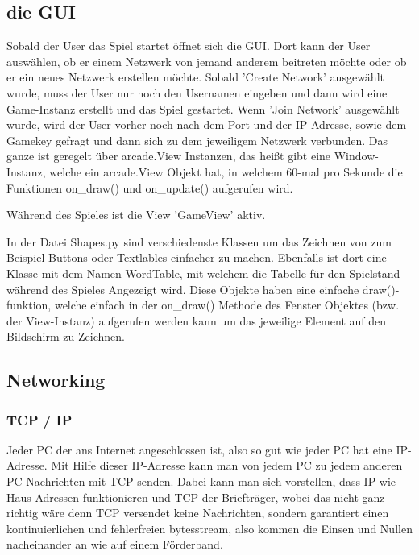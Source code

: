 \documentclass[a4paper]{article}
\begin{document}
            
        
        \subsection{die GUI}
            Sobald der User das Spiel startet öffnet sich die GUI. Dort kann der User auswählen, ob er einem Netzwerk von jemand anderem beitreten möchte oder ob er ein neues Netzwerk erstellen möchte. 
            Sobald 'Create Network' ausgewählt wurde, muss der User nur noch den Usernamen eingeben und dann wird eine Game-Instanz erstellt und das Spiel gestartet. 
            Wenn 'Join Network' ausgewählt wurde, wird der User vorher noch nach dem Port und der IP-Adresse, sowie dem Gamekey gefragt und dann sich zu dem jeweiligem Netzwerk verbunden.
            Das ganze ist geregelt über arcade.View Instanzen, das heißt gibt eine Window-Instanz, welche ein arcade.View Objekt hat, in welchem 60-mal pro Sekunde die Funktionen on\_draw() und on\_update() aufgerufen wird.
            
            Während des Spieles ist die View 'GameView' aktiv. 
            
            In der Datei Shapes.py sind verschiedenste Klassen um das Zeichnen von zum Beispiel Buttons oder Textlables einfacher zu machen.
            Ebenfalls ist dort eine Klasse mit dem Namen WordTable, mit welchem die Tabelle für den Spielstand während des Spieles Angezeigt wird.
            Diese Objekte haben eine einfache draw()-funktion, welche einfach in der on\_draw() Methode des Fenster Objektes (bzw. der View-Instanz) aufgerufen werden kann um das jeweilige Element auf den Bildschirm zu Zeichnen.
            
        
        \subsection{Networking}
            
            \subsubsection{TCP / IP}
                Jeder PC der ans Internet angeschlossen ist, also so gut wie jeder PC hat eine IP-Adresse. Mit Hilfe dieser IP-Adresse kann man von jedem PC zu jedem anderen PC Nachrichten mit TCP senden. Dabei kann man sich vorstellen, dass IP wie Haus-Adressen funktionieren und TCP der Briefträger, wobei das nicht ganz richtig wäre denn TCP versendet keine Nachrichten, sondern garantiert einen kontinuierlichen und fehlerfreien bytesstream, also kommen die Einsen und Nullen nacheinander an wie auf einem Förderband. 
                
\end{document}
